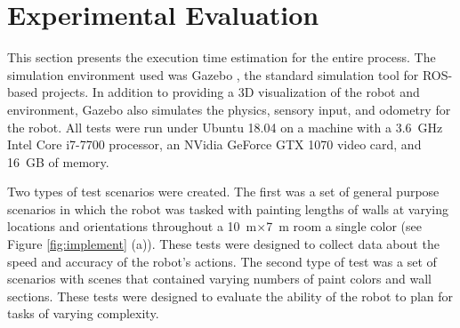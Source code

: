\section{Experimental Evaluation} \label{sec:results}
This section presents the execution time estimation for the entire process. The simulation environment used was Gazebo \cite{gazebo}, the standard simulation tool for ROS-based projects. In addition to providing a 3D visualization of the robot and environment, Gazebo also simulates the physics, sensory input, and odometry for the robot. All tests were run under Ubuntu 18.04 on a machine with a \SI{3.6}{GHz} Intel Core i7-7700 processor, an NVidia GeForce GTX 1070 video card, and \SI{16}{GB} of memory.

Two types of test scenarios were created. The first was a set of general purpose scenarios in which the robot was tasked with painting lengths of walls at varying locations and orientations throughout a \SI{10}{\meter}$\times$\SI{7}{\meter} room a single color (see Figure \ref{fig:implement} (a)). These tests were designed to collect data about the speed and accuracy of the robot's actions. The second type of test was a set of scenarios with scenes that contained varying numbers of paint colors and wall sections. These tests were designed to evaluate the ability of the robot to plan for tasks of varying complexity.

